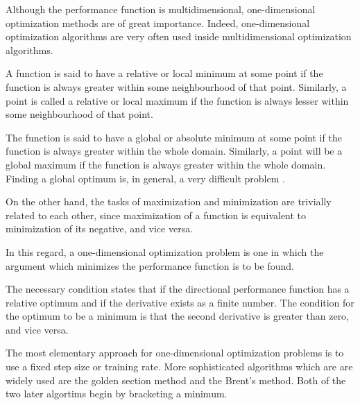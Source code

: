 


Although the performance function is multidimensional, one-dimensional optimization methods are of great importance. 
Indeed, one-dimensional optimization algorithms are very often used inside multidimensional optimization algorithms. 

A function is said to have a relative or local minimum at some point if the function is always greater within some neighbourhood of that point. 
Similarly, a point is called a relative or local maximum if the function is always lesser within some neighbourhood of that point. 

The function is said to have a global or absolute minimum at some point if the function is always greater within the whole domain. 
Similarly, a point will be a global maximum if the function is always greater within the whole domain. 
Finding a global optimum is, in general, a very difficult problem \cite{Wolpert1997}. 

On the other hand, the tasks of maximization and minimization are trivially related to
each other, since maximization of a function is
equivalent to minimization of its negative, and vice
versa.

In this regard, a one-dimensional optimization problem is one in which the argument which minimizes the performance function is to be found. 

The necessary condition states that if the directional performance function has a relative optimum  and if the derivative exists as a finite number. 
The condition for the optimum to be a minimum is that the second derivative is greater than zero, and vice versa. 

The most elementary approach for one-dimensional optimization problems is to use a fixed step size or training rate. 
More sophisticated algorithms which are are widely used are the golden section method and the
Brent's method. Both of the two later algortims begin by bracketing a minimum. 



